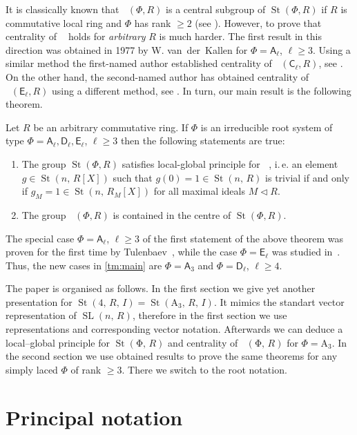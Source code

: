 \documentclass[11pt]{amsart}
\theoremstyle{plain} \declaretheorem[name=Theorem, Refname={Theorem,Theorems}]{tm} \Crefname{tm}{Theorem}{Theorems}
\numberwithin{equation}{section}
\theoremstyle{definition} \newtheorem{df}[lm]{Definition} \Crefname{df}{Definition}{Definitions}
\theoremstyle{remark} \newtheorem{rk}[lm]{Remark} \Crefname{rk}{Remark}{Remarks}
\newcommand{\St}{\mathop{\mathrm{St}}\nolimits}
\newcommand{\SL}{\mathop{\mathrm{SL}}\nolimits}
\newcommand{\Kt}{\mathop{\mathrm{K_2}}\nolimits}
\newcommand{\rA}{\mathsf{A}}
\newcommand{\rC}{\mathsf{C}}
\newcommand{\rD}{\mathsf{D}}
\newcommand{\rE}{\mathsf{E}}
\begin{document}
It is classically known that $\Kt(\Phi, R)$ is a central subgroup of $\St(\Phi, R)$ if $R$ is commutative local ring and $\Phi$ has rank $\geq 2$ (see \cite{Stein}).
However, to prove that centrality of $\Kt$ holds for \emph{arbitrary} $R$ is much harder.
The first result in this direction was obtained in 1977 by W. van~der~Kallen for $\Phi=\rA_\ell$, $\ell\geq 3$.
Using a similar method the first-named author established centrality of $\Kt(\rC_\ell, R)$, see \cite{Lav}.
On the other hand, the second-named author has obtained centrality of $\Kt(\rE_\ell, R)$ using a different method, see \cite{SCh}.
In turn, our main result is the following theorem.
\begin{tm}\label{tm:main} Let $R$ be an arbitrary commutative ring.
 If $\Phi$ is an irreducible root system of type $\Phi=\rA_\ell, \rD_\ell, \rE_\ell$, $\ell\geq 3$ then the following statements are true:
 \begin{enumerate}
  \item The group $\St(\Phi, R)$ satisfies local-global principle for $\Kt$, i.\,e. an element $g\in\St(n,\,R[X])$ such that $g(0)=1\in\St(n,\,R)$
  is trivial if and only if $g_M=1\in\St(n,\,R_M[X])$ for all maximal ideals $M\triangleleft R$.
  \item The group $\Kt(\Phi, R)$ is contained in the centre of $\St(\Phi, R)$.  
 \end{enumerate}
\end{tm}
The special case $\Phi=\rA_\ell$, $\ell\geq 3$ of the first statement of the above theorem was proven for the first time by Tulenbaev~\cite[Th.~2.1]{Tul}, while the case $\Phi=\rE_\ell$ was studied in~\cite{SCh}.
Thus, the new cases in \cref{tm:main} are $\Phi=\rA_3$ and $\Phi=\rD_\ell$, $\ell\geq 4$.

The paper is organised as follows. In the first section we give yet another presentation for $\St(4,\,R,\,I)=\St(\mathrm A_3,\,R,\,I)$.
It mimics the standart vector representation of $\SL(n,\,R)$, therefore in the first section we use representations and corresponding vector notation. 
Afterwards we can deduce a local--global principle for $\St(\mathrm\Phi,\,R)$ and centrality of $\Kt(\mathrm\Phi,\,R)$ for $\Phi=\mathrm A_3$. 
In the second section we use obtained results to prove the same theorems for any simply laced $\Phi$ of rank $\geq3$. There we switch to the root notation.

\section{Principal notation}
\end{document}
